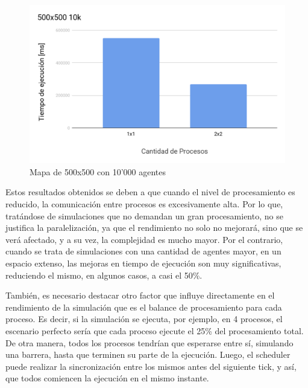 \begin{figure}[H]
	\centering
	\includegraphics{Rendimiento4.png}
	\caption{Mapa de 500x500 con 10'000 agentes}
\end{figure}

\vspace{1\linewidth}

Estos resultados obtenidos se deben a que cuando el nivel de
procesamiento es reducido, la comunicación entre procesos es
excesivamente alta. Por lo que, tratándose de simulaciones que no
demandan un gran procesamiento, no se justifica la paralelización, ya
que el rendimiento no solo no mejorará, sino que se verá afectado, y a
su vez, la complejidad es mucho mayor. Por el contrario, cuando se trata
de simulaciones con una cantidad de agentes mayor, en un espacio
extenso, las mejoras en tiempo de ejecución son muy significativas,
reduciendo el mismo, en algunos casos, a casi el 50\%.

También, es necesario destacar otro factor que influye directamente en
el rendimiento de la simulación que es el balance de procesamiento para
cada proceso. Es decir, si la simulación se ejecuta, por ejemplo, en 4
procesos, el escenario perfecto sería que cada proceso ejecute el 25\%
del procesamiento total. De otra manera, todos los procesos tendrían que
esperarse entre sí, simulando una barrera, hasta que terminen su parte
de la ejecución. Luego, el scheduler puede realizar la sincronización
entre los mismos antes del siguiente tick, y así, que todos comiencen la
ejecución en el mismo instante.

